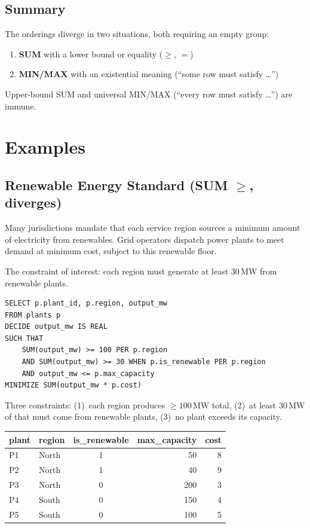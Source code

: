 \documentclass[11pt]{article}
\begin{document}
\subsection*{Summary}

The orderings diverge in two situations, both requiring an empty group:

\begin{enumerate}[leftmargin=2em]
    \item \textbf{SUM} with a lower bound or equality ($\geq$, $=$)
    \item \textbf{MIN/MAX} with an existential meaning (``some row must satisfy \ldots'')
\end{enumerate}

Upper-bound SUM and universal MIN/MAX (``every row must satisfy
\ldots'') are immune.

\section{Examples}


\subsection{Renewable Energy Standard (SUM $\geq$, diverges)}

Many jurisdictions mandate that each service region sources a minimum amount of
electricity from renewables. Grid operators dispatch power plants to meet
demand at minimum cost, subject to this renewable floor.

The constraint of interest: each region must generate at least 30\,MW from
renewable plants.

\begin{lstlisting}
SELECT p.plant_id, p.region, output_mw
FROM plants p
DECIDE output_mw IS REAL
SUCH THAT
    SUM(output_mw) >= 100 PER p.region
    AND SUM(output_mw) >= 30 WHEN p.is_renewable PER p.region
    AND output_mw <= p.max_capacity
MINIMIZE SUM(output_mw * p.cost)
\end{lstlisting}

Three constraints: (1)~each region produces $\geq 100$\,MW total,
(2)~at least 30\,MW of that must come from renewable plants,
(3)~no plant exceeds its capacity.

\begin{center}
\begin{tabular}{llcrr}
\toprule
\textbf{plant} & \textbf{region} & \textbf{is\_renewable} & \textbf{max\_capacity} & \textbf{cost} \\
\midrule
P1 & North & 1 & 50  & 8 \\
P2 & North & 1 & 40  & 9 \\
P3 & North & 0 & 200 & 3 \\
P4 & South & 0 & 150 & 4 \\
P5 & South & 0 & 100 & 5 \\
\bottomrule
\end{tabular}
\end{center}
\end{document}
